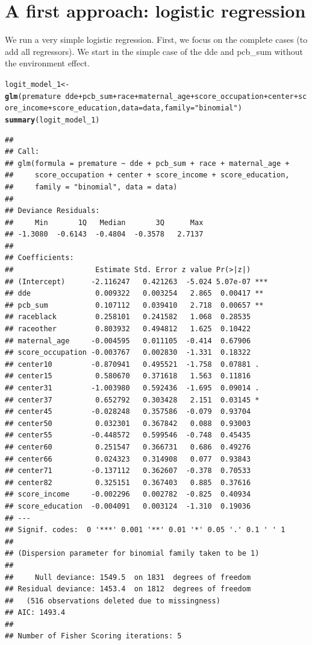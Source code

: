 \documentclass{article}\usepackage[]{graphicx}\usepackage[]{color}
\makeatletter
\newcommand{\hlstr}[1]{\textcolor[rgb]{0.192,0.494,0.8}{#1}}%
\newcommand{\hlopt}[1]{\textcolor[rgb]{0,0,0}{#1}}%
\newcommand{\hlstd}[1]{\textcolor[rgb]{0.345,0.345,0.345}{#1}}%
\newcommand{\hlkwb}[1]{\textcolor[rgb]{0.69,0.353,0.396}{#1}}%
\newcommand{\hlkwc}[1]{\textcolor[rgb]{0.333,0.667,0.333}{#1}}%
\newcommand{\hlkwd}[1]{\textcolor[rgb]{0.737,0.353,0.396}{\textbf{#1}}}%
\newenvironment{kframe}{%
 \def\at@end@of@kframe{}%
 \ifinner\ifhmode%
  \def\at@end@of@kframe{\end{minipage}}%
  \begin{minipage}{\columnwidth}%
 \fi\fi%
 \def\FrameCommand##1{\hskip\@totalleftmargin \hskip-\fboxsep
 \colorbox{shadecolor}{##1}\hskip-\fboxsep
     \hskip-\linewidth \hskip-\@totalleftmargin \hskip\columnwidth}%
 \MakeFramed {\advance\hsize-\width
   \@totalleftmargin\z@ \linewidth\hsize
   \@setminipage}}%
 {\par\unskip\endMakeFramed%
 \at@end@of@kframe}
\newenvironment{knitrout}{}{} %
\makeatother
\begin{document}
\section{A first approach: logistic regression}
We run a very simple logistic regression. First, we focus on the complete cases (to add all regressors). We start in the simple case of the dde and pcb\_sum without the environment effect.
\begin{knitrout}
\color{fgcolor}\begin{kframe}
\begin{alltt}
\hlstd{logit_model_1} \hlkwb{<-} \hlkwd{glm}\hlstd{(premature} \hlopt{~} \hlstd{dde} \hlopt{+} \hlstd{pcb_sum} \hlopt{+} \hlstd{race} \hlopt{+} \hlstd{maternal_age} \hlopt{+} \hlstd{score_occupation} \hlopt{+} \hlstd{center} \hlopt{+} \hlstd{score_income} \hlopt{+} \hlstd{score_education,} \hlkwc{data} \hlstd{= data,} \hlkwc{family} \hlstd{=} \hlstr{"binomial"}\hlstd{)}
\hlkwd{summary}\hlstd{(logit_model_1)}
\end{alltt}
\begin{verbatim}
## 
## Call:
## glm(formula = premature ~ dde + pcb_sum + race + maternal_age + 
##     score_occupation + center + score_income + score_education, 
##     family = "binomial", data = data)
## 
## Deviance Residuals: 
##     Min       1Q   Median       3Q      Max  
## -1.3080  -0.6143  -0.4804  -0.3578   2.7137  
## 
## Coefficients:
##                   Estimate Std. Error z value Pr(>|z|)    
## (Intercept)      -2.116247   0.421263  -5.024 5.07e-07 ***
## dde               0.009322   0.003254   2.865  0.00417 ** 
## pcb_sum           0.107112   0.039410   2.718  0.00657 ** 
## raceblack         0.258101   0.241582   1.068  0.28535    
## raceother         0.803932   0.494812   1.625  0.10422    
## maternal_age     -0.004595   0.011105  -0.414  0.67906    
## score_occupation -0.003767   0.002830  -1.331  0.18322    
## center10         -0.870941   0.495521  -1.758  0.07881 .  
## center15          0.580670   0.371618   1.563  0.11816    
## center31         -1.003980   0.592436  -1.695  0.09014 .  
## center37          0.652792   0.303428   2.151  0.03145 *  
## center45         -0.028248   0.357586  -0.079  0.93704    
## center50          0.032301   0.367842   0.088  0.93003    
## center55         -0.448572   0.599546  -0.748  0.45435    
## center60          0.251547   0.366731   0.686  0.49276    
## center66          0.024323   0.314908   0.077  0.93843    
## center71         -0.137112   0.362607  -0.378  0.70533    
## center82          0.325151   0.367403   0.885  0.37616    
## score_income     -0.002296   0.002782  -0.825  0.40934    
## score_education  -0.004091   0.003124  -1.310  0.19036    
## ---
## Signif. codes:  0 '***' 0.001 '**' 0.01 '*' 0.05 '.' 0.1 ' ' 1
## 
## (Dispersion parameter for binomial family taken to be 1)
## 
##     Null deviance: 1549.5  on 1831  degrees of freedom
## Residual deviance: 1453.4  on 1812  degrees of freedom
##   (516 observations deleted due to missingness)
## AIC: 1493.4
## 
## Number of Fisher Scoring iterations: 5
\end{verbatim}
\end{kframe}
\end{knitrout}
\end{document}
